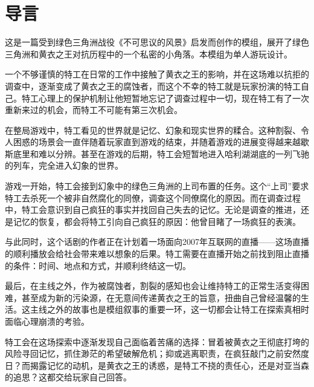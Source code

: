 \section{导言}

这是一篇受到绿色三角洲战役《不可思议的风景》启发而创作的模组，展开了绿色三角洲和黄衣之王对抗历程中的一个私密的小角落。本模组为单人游玩设计。

一个不够谨慎的特工在日常的工作中接触了黄衣之王的影响，并在这场难以抗拒的调查中，逐渐变成了黄衣之王的腐蚀者，而这个不幸的特工就是玩家扮演的特工自己。特工心理上的保护机制让他短暂地忘记了调查过程中一切，现在特工有了一次重新来过的机会，而特工不可能有第三次机会。

在整局游戏中，特工看见的世界就是记忆、幻象和现实世界的糅合。这种割裂、令人困惑的场景会一直伴随着玩家直到游戏的结束，并随着游戏的进展变得越来越歇斯底里和难以分辨。甚至在游戏的后期，特工会短暂地进入哈利湖湖底的一列飞驰的列车，完全进入幻象的世界。

游戏一开始，特工会接到幻象中的绿色三角洲的上司布置的任务。这个“上司”要求特工去杀死一个被非自然腐化的同僚，调查这个同僚腐化的原因。而在调查过程中，特工会意识到自己疯狂的事实并找回自己失去的记忆。无论是调查的推进，还是记忆的恢复，都会将特工引向自己疯狂的原因：他曾目睹了一场疯狂的表演。

与此同时，这个话剧的作者正在计划着一场面向2007年互联网的直播——这场直播的顺利播放会给社会带来难以想象的后果。特工需要在直播开始之前找到阻止直播的条件：时间、地点和方式，并顺利终结这一切。

最后，在主线之外，作为被腐蚀者，割裂的感知也会让维持特工的正常生活变得困难，甚至成为新的污染源，在无意间传递黄衣之王的旨意，扭曲自己曾经温馨的生活。这主线之外的故事也是模组叙事的重要一环，这一切都会让特工在探索真相时面临心理崩溃的考验。

特工会在这场探索中逐渐发现自己面临着苦痛的选择：冒着被黄衣之王彻底打垮的风险寻回记忆，抓住渺茫的希望破解危机；抑或逃离职责，在疯狂敲门之前安然度日？而揭露记忆的动机，是黄衣之王的诱惑，是特工不挠的责任心，还是对亚当森的追思？这都交给玩家自己回答。